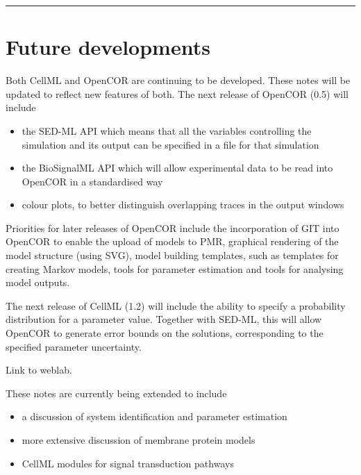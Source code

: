 \documentclass[a4paper,10pt,english]{sphinxmanual}
\begin{document}
\bigskip\hrule{}\bigskip



\chapter{Future developments}
\label{future::doc}\label{future:future-developments}
Both CellML and OpenCOR are continuing to be developed. These notes will
be updated to reflect new features of both. The next release of OpenCOR
(0.5) will include
\begin{itemize}
\item {} 
the SED-ML API which means that all the variables controlling the
simulation and its output can be specified in a file for that
simulation

\item {} 
the BioSignalML API which will allow experimental data to be read
into OpenCOR in a standardised way

\item {} 
colour plots, to better distinguish overlapping traces in the output
windows

\end{itemize}

Priorities for later releases of OpenCOR include the incorporation of
GIT into OpenCOR to enable the upload of models to PMR, graphical
rendering of the model structure (using SVG), model building templates,
such as templates for creating Markov models, tools for parameter
estimation and tools for analysing model outputs.

The next release of CellML (1.2) will include the ability to specify a
probability distribution for a parameter value. Together with SED-ML,
this will allow OpenCOR to generate error bounds on the solutions,
corresponding to the specified parameter uncertainty.

Link to weblab.

These notes are currently being extended to include
\begin{itemize}
\item {} 
a discussion of system identification and parameter estimation

\item {} 
more extensive discussion of membrane protein models

\item {} 
CellML modules for signal transduction pathways

\end{itemize}
\end{document}
